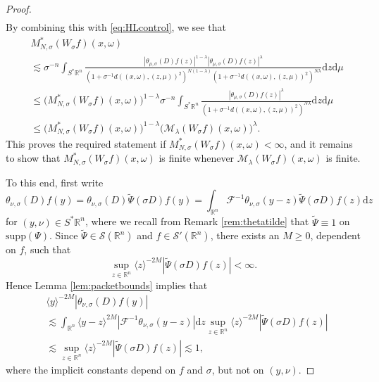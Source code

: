 \documentclass{amsart}
\newcommand {\ud}{\mathrm{d}}
\newcommand {\F}{\mathcal{F}}
\newcommand {\la}{\lambda}
\newcommand {\rb}{\rangle}
\newcommand {\lb}{\langle}
\newcommand {\Ma}{\mathcal{M}}
\newcommand {\Rn}{\mathbb{R}^{n}}
\newcommand {\supp}{\mathrm{supp}}
\newcommand {\Sp}{S^{*}\Rn}
\newcommand {\Sw}{\mathcal{S}}
\newcommand {\w}{\omega}
\newcommand {\wt}{\widetilde}
\theoremstyle{definition}
\numberwithin{equation}{section}
\begin{document}
\begin{proof}
\begin{align*}
\end{align*}
By combining this with \eqref{eq:HLcontrol}, we see that
\begin{align*}
&M_{N,\sigma}^{*}(W_{\sigma}f)(x,\omega)\\
&\lesssim \sigma^{-n}\int_{\Sp}\frac{|
\theta_{\mu,\sigma}(D)f(z)|^{1-\lambda} |\theta_{\mu,\sigma}(D)f(z)|^{\lambda}}{(1+\sigma^{-1}d((x,\omega),(z,\mu))^{2})^{N(1-\la)}(1+\sigma^{-1}d((x,\omega),(z,\mu))^{2})^{N\la}}\ud z\ud\mu\\
&\leq \big(M_{N,\sigma}^{*}(W_{\sigma}f)(x,\omega)\big)^{1-\lambda}
{\sigma}^{-n}\int_{\Sp}\frac{|\theta_{\mu,\sigma}(D)f(z)|^{\lambda}}{(1+\sigma^{-1}d((x,\omega),(z,\mu))^{2})^{N\lambda}}\ud z\ud\mu\\
&\leq \big(M_{N,\sigma}^{*}(W_{\sigma}f)(x,\omega)\big)^{1-\lambda}
\big(\Ma_{\lambda}(W_{\sigma}f)(x,\omega)\big)^{\lambda}.
\end{align*}
This proves the required statement if $M_{N,\sigma}^{*}(W_{\sigma}f)(x,\omega)<\infty$, and it remains to show that $M_{N,\sigma}^{*}(W_{\sigma}f)(x,\w)$ is finite whenever $\mathcal{M}_{\lambda}(W_{\sigma}f)(x,\omega)$ is finite.

To this end, first write 
\[
\theta_{\nu,\sigma}(D)f(y)=\theta_{\nu,\sigma}(D)\wt{\Psi}(\sigma D)f(y)
=\int_{\Rn}\F^{-1}\theta_{\nu,\sigma}(y-z)\wt{\Psi}(\sigma D)f(z)\ud z
\]
for $(y,\nu)\in\Sp$, where we recall from Remark \ref{rem:thetatilde} that $\wt{\Psi}\equiv1$ on $\supp(\Psi)$. Since $\wt{\Psi}\in \Sw(\Rn)$ and $f\in\Sw'(\Rn)$, there exists an $M\geq0$, dependent on $f$, such that
\[
\sup_{z\in\Rn}\lb z\rb^{-2M}|\wt{\Psi}(\sigma D)f(z)|<\infty.
\]
Hence Lemma \ref{lem:packetbounds} implies that
\begin{equation}\label{eq:decaydependent}
\begin{aligned}
&\lb y\rb^{-2M}|\theta_{\nu,\sigma}(D)f(y)|\\
&\lesssim\int_{\Rn} \lb y-z\rb^{2M}|\F^{-1}\theta_{\nu,\sigma}(y-z)|\ud z\sup_{z\in\Rn} \lb z\rb^{-2M}|\wt{\Psi}(\sigma D)f(z)|\\
 &\lesssim \sup_{z\in\Rn} \lb z\rb^{-2M}|\wt{\Psi}(\sigma D)f(z)|\lesssim 1,
\end{aligned}
\end{equation}
where the implicit constants depend on $f$ and $\sigma$, but not on $(y,\nu)$.


\end{proof}
\end{document}
